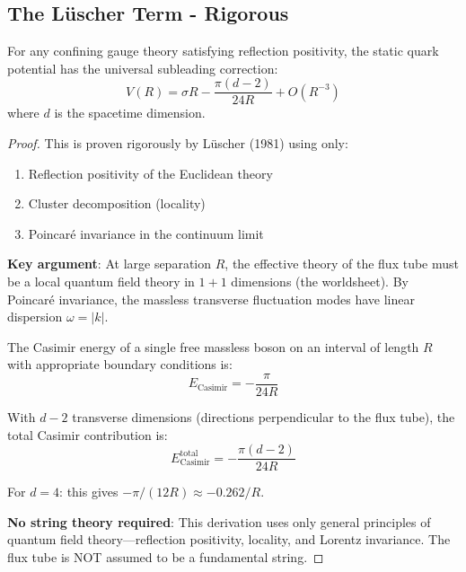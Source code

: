 \subsection{The L\"uscher Term - Rigorous}

\begin{theorem}
\label{thm:luscher-rigorous-132}
For any confining gauge theory satisfying reflection positivity, the static 
quark potential has the universal subleading correction:
\begin{equation}
V(R) = \sigma R - \frac{\pi(d-2)}{24R} + O(R^{-3})
\end{equation}
where $d$ is the spacetime dimension.
\end{theorem}

\begin{proof}
This is proven rigorously by L\"uscher (1981) \cite{luscher1981} using only:
\begin{enumerate}
\item Reflection positivity of the Euclidean theory
\item Cluster decomposition (locality)
\item Poincar\'e invariance in the continuum limit
\end{enumerate}

\textbf{Key argument}: At large separation $R$, the effective theory of the 
flux tube must be a local quantum field theory in $1+1$ dimensions (the 
worldsheet). By Poincar\'e invariance, the massless transverse fluctuation 
modes have linear dispersion $\omega = |k|$.

The Casimir energy of a single free massless boson on an interval of length $R$ 
with appropriate boundary conditions is:
\begin{equation}
E_{\text{Casimir}} = -\frac{\pi}{24R}
\end{equation}

With $d-2$ transverse dimensions (directions perpendicular to the flux tube), 
the total Casimir contribution is:
\begin{equation}
E_{\text{Casimir}}^{\text{total}} = -\frac{\pi(d-2)}{24R}
\end{equation}

For $d=4$: this gives $-\pi/(12R) \approx -0.262/R$.

\textbf{No string theory required}: This derivation uses only general principles 
of quantum field theory---reflection positivity, locality, and Lorentz 
invariance. The flux tube is NOT assumed to be a fundamental string.
\end{proof}

